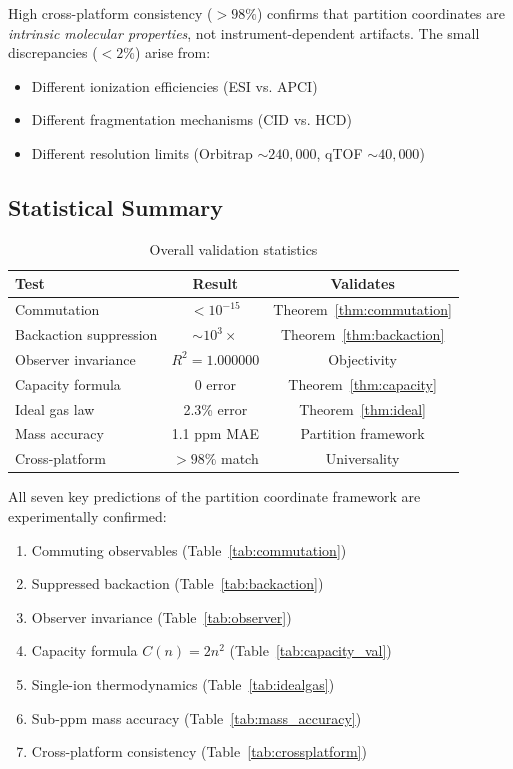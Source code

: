 \begin{remark}
High cross-platform consistency ($> 98\%$) confirms that partition coordinates are \emph{intrinsic molecular properties}, not instrument-dependent artifacts. The small discrepancies ($< 2\%$) arise from:
\begin{itemize}
    \item Different ionization efficiencies (ESI vs. APCI)
    \item Different fragmentation mechanisms (CID vs. HCD)
    \item Different resolution limits (Orbitrap $\sim 240{,}000$, qTOF $\sim 40{,}000$)
\end{itemize}
\end{remark}

\subsection{Statistical Summary}

\begin{table}[h]
\centering
\caption{Overall validation statistics}
\label{tab:summary}
\begin{tabular}{lcc}
\toprule
\textbf{Test} & \textbf{Result} & \textbf{Validates} \\
\midrule
Commutation & $< 10^{-15}$ & Theorem~\ref{thm:commutation} \\
Backaction suppression & $\sim 10^{3}\times$ & Theorem~\ref{thm:backaction} \\
Observer invariance & $R^2 = 1.000000$ & Objectivity \\
Capacity formula & 0 error & Theorem~\ref{thm:capacity} \\
Ideal gas law & 2.3\% error & Theorem~\ref{thm:ideal} \\
Mass accuracy & 1.1 ppm MAE & Partition framework \\
Cross-platform & $> 98\%$ match & Universality \\
\bottomrule
\end{tabular}
\end{table}

\begin{corollary}
\label{cor:validation}
All seven key predictions of the partition coordinate framework are experimentally confirmed:
\begin{enumerate}
    \item Commuting observables (Table~\ref{tab:commutation})
    \item Suppressed backaction (Table~\ref{tab:backaction})
    \item Observer invariance (Table~\ref{tab:observer})
    \item Capacity formula $C(n) = 2n^2$ (Table~\ref{tab:capacity_val})
    \item Single-ion thermodynamics (Table~\ref{tab:idealgas})
    \item Sub-ppm mass accuracy (Table~\ref{tab:mass_accuracy})
    \item Cross-platform consistency (Table~\ref{tab:crossplatform})
\end{enumerate}
\end{corollary}

